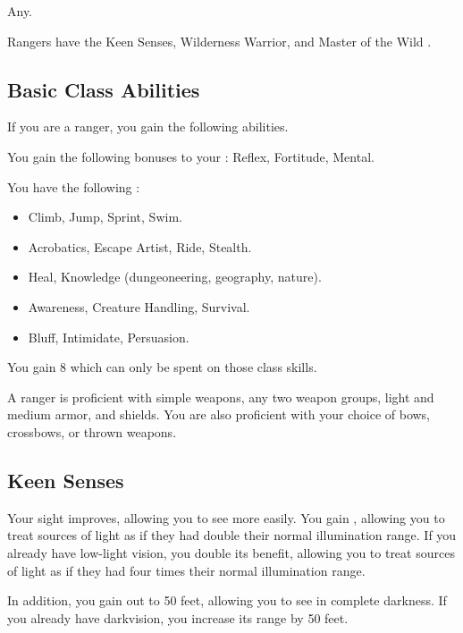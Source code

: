      Any.

     Rangers have the Keen Senses, Wilderness Warrior, and Master of the Wild .

    \subsection{Basic Class Abilities}
        If you are a ranger, you gain the following abilities.

        You gain the following bonuses to your :  Reflex,  Fortitude,  Mental.

        You have the following :
        \begin{itemize}
            \item {} Climb, Jump, Sprint, Swim.
            \item {} Acrobatics, Escape Artist, Ride, Stealth.
            \item {} Heal, Knowledge (dungeoneering, geography, nature).
            \item {} Awareness, Creature Handling, Survival.
            \item {} Bluff, Intimidate, Persuasion.
        \end{itemize}
        You gain 8  which can only be spent on those class skills.

        A ranger is proficient with simple weapons, any two weapon groups, light and medium armor, and shields.
        You are also proficient with your choice of bows, crossbows, or thrown weapons.

    \subsection{Keen Senses}
        Your sight improves, allowing you to see more easily.
        You gain , allowing you to treat sources of light as if they had double their normal illumination range.
        If you already have low-light vision, you double its benefit, allowing you to treat sources of light as if they had four times their normal illumination range.

        In addition, you gain  out to 50 feet, allowing you to see in complete darkness.
        If you already have darkvision, you increase its range by 50 feet.

